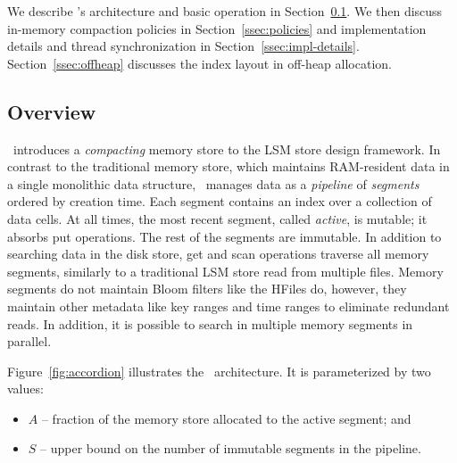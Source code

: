 
We describe  \sys's architecture and basic operation in Section~\ref{ssec:overview}.
We then discuss in-memory compaction policies  in  Section~\ref{ssec:policies}
and implementation details and thread synchronization in Section~\ref{ssec:impl-details}.
Section~\ref{ssec:offheap} discusses the   index layout in off-heap allocation.


\subsection{Overview} \label{ssec:overview}


\sys\ introduces a \emph{compacting} memory store to the LSM store design framework. In contrast to the traditional memory store, 
which maintains RAM-resident data in a single monolithic data structure, \sys\ manages data as a \emph{pipeline} of 
\emph{segments} ordered by creation time. Each segment contains an index over a collection of data cells.
At all times, the most recent segment, called \emph{active}, is mutable;
it absorbs put operations. The rest of the segments are immutable.  
%
In addition to searching data in the disk store, get and scan operations traverse all memory segments,  similarly to a traditional LSM store read from multiple files. 
Memory segments do not maintain Bloom filters like the HFiles do, however, they maintain other metadata like key ranges and time ranges to eliminate redundant reads. In addition, it is possible to search in multiple memory segments in parallel.
  
Figure~\ref{fig:accordion} illustrates the \sys\ architecture. It is parameterized by two values:
\begin{itemize}
\item  $A$ --  fraction of the memory store allocated to the active segment; and 
\item $S$ --  upper bound on the number of immutable segments in the pipeline. 
\end{itemize}

